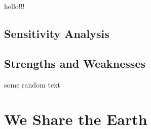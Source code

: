 \documentclass[12pt]{article}
\begin{document}
	hello!!! \\

	\subsection{Sensitivity Analysis}

	\subsection{Strengths and Weaknesses}

	some random text
	
\section*{We Share the Earth}



\newrefcontext
\printbibliography
\end{document}
